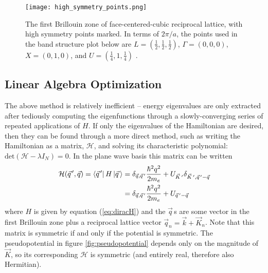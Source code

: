 \documentclass[12pt]{article}
\begin{document}
\begin{figure}
\centering
\texttt{[image: high\_symmetry\_points.png]}
\caption{The first Brillouin zone of face-centered-cubic reciprocal lattice, with high symmetry points marked. In terms of $2 \pi / a$, the points used in the band structure plot below are $L = (\frac{1}{2}, \frac{1}{2}, \frac{1}{2})$, $\Gamma = (0,0,0)$, $X = (0,1,0)$, and $U = (\frac{1}{4}, 1, \frac{1}{4})$ \cite{fccsite}.}
\label{fig:highsym}
\end{figure}

\subsection{Linear Algebra Optimization}
\par The above method is relatively inefficient -- energy eigenvalues are only extracted after tediously computing the eigenfunctions through a slowly-converging series of repeated applications of $H$. If only the eigenvalues of the Hamiltonian are desired, then they can be found through a more direct method, such as writing the Hamiltonian as a matrix, $\mathcal{H}$, and solving its characteristic polynomial: $\textrm{det}(\mathcal{H} - \lambda I_{N} ) = 0$. In the plane wave basis this matrix can be written 
\begin{equation}
\begin{aligned}
\mathcal{H} (\vec{q}^{\, \prime}, \vec{q}) = \bra{\vec{q}^{\, \prime}} H \ket{\vec{q}\,} &= \delta_{\vec{q},\vec{q}^{\, \prime}} \frac{\hbar^2 q^2}{2 m_e} + U_{\vec{K}^{\, \prime}} \delta_{\vec{K}^{\, \prime}, \vec{q}^{\, \prime}-\vec{q}} \\
&= \delta_{\vec{q},\vec{q}^{\, \prime}} \frac{\hbar^2 q^2}{2 m_e} + U_{\vec{q}^{\, \prime}-\vec{q}}
\end{aligned}
\label{eq:matrixH}
\end{equation}
 where $H$ is given by equation (\ref{eq:diracH}) and the $\vec{q}$\,s are some vector in the first Brillouin zone plus a reciprocal lattice vector $\vec{q}_n = \vec{k}+\vec{K}_n$. Note that this matrix is symmetric if and only if the potential is symmetric. The pseudopotential in figure \ref{fig:pseudopotential} depends only on the magnitude of $\vec{K}$, so its corresponding $\mathcal{H}$ is symmetric (and entirely real, therefore also Hermitian).
\begin{comment}
\begin{align*}
\mathcal{H} \left( \begin{array}{c}
\psi (q_0)\\ \psi (q_1) \\ \vdots \\
\end{array} \right) 
= \varepsilon \left( 
\begin{array}{c}
\psi (q_0)\\ \psi (q_1) \\ \vdots
\end{array} \right) .
\end{align*}
\end{comment}
\end{document}
